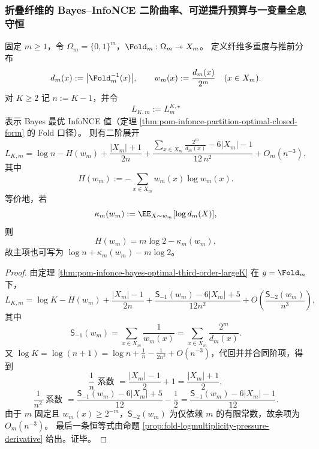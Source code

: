 \subsubsection{折叠纤维的 Bayes--InfoNCE 二阶曲率、可逆提升预算与一变量全息守恒}\label{subsubsec:xi-time-protocol-conclusions-part46}

\begin{theorem}\label{thm:xi-fold-bayes-infonce-second-order-reciprocal-fiber}
固定 \(m\ge 1\)，令 \(\Omega_m=\{0,1\}^m\)，\(\Fold_m:\Omega_m\twoheadrightarrow X_m\)。
定义纤维多重度与推前分布
\[
d_m(x):=\bigl|\Fold_m^{-1}(x)\bigr|,
\qquad
w_m(x):=\frac{d_m(x)}{2^m}\quad(x\in X_m).
\]
对 \(K\ge 2\) 记 \(n:=K-1\)，并令
\[
L_{K,m}:=L_m^{K,\star}
\]
表示 Bayes 最优 InfoNCE 值（定理 \ref{thm:pom-infonce-partition-optimal-closed-form} 的 Fold 口径）。
则有二阶展开
\[
L_{K,m}
=\log n-H(w_m)
+\frac{|X_m|+1}{2n}
+\frac{\displaystyle \sum_{x\in X_m}\frac{2^m}{d_m(x)}-6|X_m|-1}{12\,n^2}
+O_m(n^{-3}),
\]
其中
\[
H(w_m):=-\sum_{x\in X_m}w_m(x)\log w_m(x).
\]
等价地，若
\[
\kappa_m(w_m):=\EE_{X\sim w_m}[\log d_m(X)],
\]
则
\[
H(w_m)=m\log 2-\kappa_m(w_m),
\]
故主项也可写为 \(\log n+\kappa_m(w_m)-m\log 2\)。
\end{theorem}
\begin{proof}
由定理 \ref{thm:pom-infonce-bayes-optimal-third-order-largeK} 在 \(g=\Fold_m\) 下，
\[
L_{K,m}
=\log K-H(w_m)
+\frac{|X_m|-1}{2n}
+\frac{\mathsf S_{-1}(w_m)-6|X_m|+5}{12n^2}
+O\!\left(\frac{\mathsf S_{-2}(w_m)}{n^3}\right),
\]
其中
\[
\mathsf S_{-1}(w_m)=\sum_{x\in X_m}\frac{1}{w_m(x)}
=\sum_{x\in X_m}\frac{2^m}{d_m(x)}.
\]
又 \(\log K=\log(n+1)=\log n+\frac1n-\frac{1}{2n^2}+O(n^{-3})\)，代回并并合同阶项，得到
\[
\frac1n\text{ 系数 }=\frac{|X_m|-1}{2}+1=\frac{|X_m|+1}{2},
\]
\[
\frac1{n^2}\text{ 系数 }=\frac{\mathsf S_{-1}(w_m)-6|X_m|+5}{12}-\frac12
=\frac{\mathsf S_{-1}(w_m)-6|X_m|-1}{12}.
\]
由于 \(m\) 固定且 \(w_m(x)\ge 2^{-m}\)，\(\mathsf S_{-2}(w_m)\) 为仅依赖 \(m\) 的有限常数，故余项为 \(O_m(n^{-3})\)。
最后一条恒等式由命题 \ref{prop:fold-logmultiplicity-pressure-derivative} 给出。证毕。
\end{proof}

